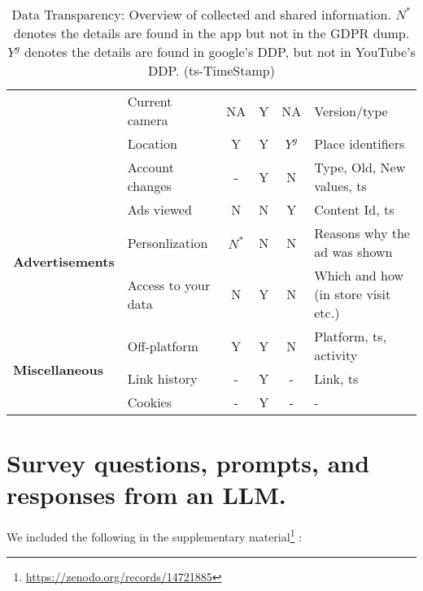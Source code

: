 \begin{table*}[!h]
\begin{tabular}{@{}llcccl@{}}
                                         & Current camera                    & NA              & Y                  & NA               & Version/type                                         \\
                                         & Location                          & Y               & Y                  & $Y^g$            & Place identifiers                                    \\
                                         & Account changes                   & -               & Y                  & N                & Type, Old, New values, ts                            \\ \midrule
\multirow{3}{*}{\textbf{Advertisements}}   & Ads viewed                        & N               & N                  & Y                & Content Id, ts                                       \\
                                         & Personlization                    & ${N^*}$         & N                  & N                & Reasons why the ad was shown                         \\
                                         & Access to your data               & N               & Y                  & N                & Which and how (in store visit etc.)                  \\ \midrule
\multirow{3}{*}{\textbf{Miscellaneous}}          & Off-platform                      & Y               & Y                  & N                & Platform, ts, activity                               \\
                                         & Link history                      & -               & Y                  & -                & Link, ts                                             \\
                                         & Cookies                           & -               & Y                  & -                & -                                                    \\ \bottomrule
\end{tabular}
\caption{Data Transparency: Overview of collected and shared information. ${N^*}$ denotes the details are found in the app but not in the GDPR dump. ${Y^g}$ denotes the details are found in google's DDP, but not in YouTube's DDP. (ts-TimeStamp)}
\label{Tab: DDPInformation}
\end{table*}


\section{Survey questions, prompts, and responses from an LLM.}
\label{appendix:survey}
We included the following in the supplementary material\footnote{\url{https://zenodo.org/records/14721885}} : 

